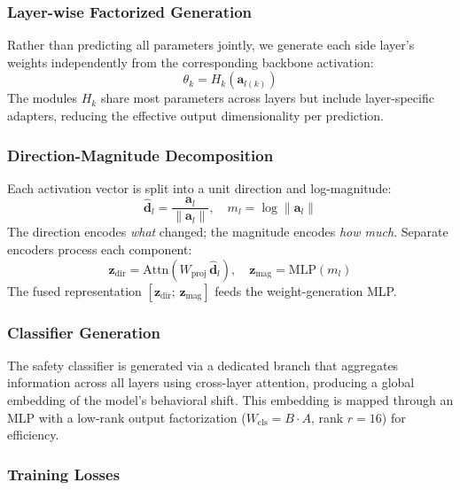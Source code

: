 \documentclass[11pt]{article}
\begin{document}
\subsubsection{Layer-wise Factorized Generation}

Rather than predicting all parameters jointly, we generate each side layer's weights independently from the corresponding backbone activation:
\begin{equation}
    \theta_k = H_k(\mathbf{a}_{l(k)})
\end{equation}
The modules $H_k$ share most parameters across layers but include layer-specific adapters, reducing the effective output dimensionality per prediction.

\subsubsection{Direction-Magnitude Decomposition}

Each activation vector is split into a unit direction and log-magnitude:
\begin{equation}
    \hat{\mathbf{d}}_l = \frac{\mathbf{a}_l}{\|\mathbf{a}_l\|}, \quad m_l = \log \|\mathbf{a}_l\|
\end{equation}
The direction encodes \textit{what} changed; the magnitude encodes \textit{how much}. Separate encoders process each component:
\begin{equation}
    \mathbf{z}_\text{dir} = \text{Attn}(W_\text{proj}\,\hat{\mathbf{d}}_l), \quad
    \mathbf{z}_\text{mag} = \text{MLP}(m_l)
\end{equation}
The fused representation $[\mathbf{z}_\text{dir};\, \mathbf{z}_\text{mag}]$ feeds the weight-generation MLP.

\subsubsection{Classifier Generation}

The safety classifier is generated via a dedicated branch that aggregates information across all layers using cross-layer attention, producing a global embedding of the model's behavioral shift. This embedding is mapped through an MLP with a low-rank output factorization ($W_\text{cls} = B \cdot A$, rank $r{=}16$) for efficiency.

\subsubsection{Training Losses}
\end{document}
